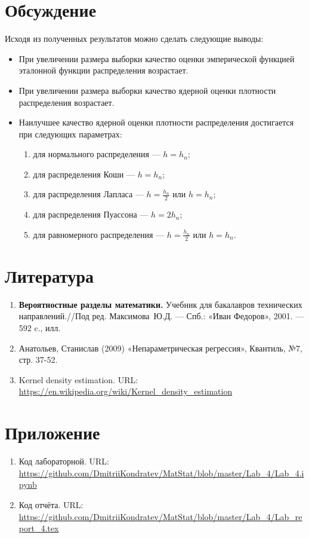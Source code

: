 \documentclass[12pt,a4paper]{article}
\begin{document}
	\section{Обсуждение}
	Исходя из полученных результатов можно сделать следующие выводы:
	\begin{itemize}
		\item При увеличении размера выборки  качество оценки эмперической функцией эталонной функции распределения возрастает.
		
		\item При увеличении размера выборки  качество ядерной оценки плотности распределения возрастает.
		
		\item Наилучшее качество ядерной оценки плотности распределения достигается при следующих параметрах:
		\begin{enumerate}
			\item для нормального распределения --- $h=h_n$;
			
			\item для распределения Коши --- $h=h_n$;
			
			\item для распределения Лапласа --- $h=\frac{h_n}{2}$ или $h=h_n$;
			
			\item для распределения Пуассона --- $h=2h_n$;
			
			\item для равномерного распределения --- $h=\frac{h_n}{2}$ или $h=h_n$.
		\end{enumerate}
	\end{itemize}
	
	\section{Литература}
	\begin{enumerate}
		\item \label{Book_1} \textbf{Вероятностные разделы математики.} Учебник для бакалавров технических направлений.//Под ред. Максимова~Ю.Д. --- Спб.: «Иван Федоров», 2001. --- 592 c., илл.
		
		\item \label{Book_2} Анатольев, Станислав (2009) «Непараметрическая регрессия», Квантиль, №7, стр. 37-52.
		
		\item Kernel density estimation. URL: \url{https://en.wikipedia.org/wiki/Kernel_density_estimation}
	\end{enumerate}

	\section{Приложение}
	\begin{enumerate}
		\item Код лабораторной. URL: \url{https://github.com/DmitriiKondratev/MatStat/blob/master/Lab_4/Lab_4.ipynb}
		
		\item Код отчёта. URL: \url{https://github.com/DmitriiKondratev/MatStat/blob/master/Lab_4/Lab_report_4.tex}
		
	\end{enumerate}
\end{document}
